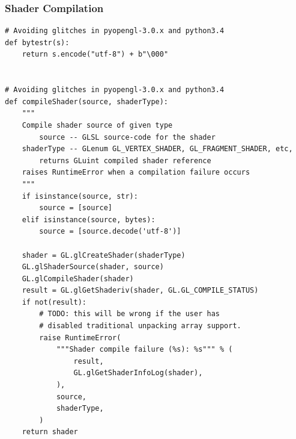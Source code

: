 \documentclass{beamer}
\begin{document}
\begin{frame}[fragile]
\frametitle{Shader Compilation}
\begin{verbatim}
# Avoiding glitches in pyopengl-3.0.x and python3.4
def bytestr(s):
    return s.encode("utf-8") + b"\000"


# Avoiding glitches in pyopengl-3.0.x and python3.4
def compileShader(source, shaderType):
    """
    Compile shader source of given type
        source -- GLSL source-code for the shader
    shaderType -- GLenum GL_VERTEX_SHADER, GL_FRAGMENT_SHADER, etc,
        returns GLuint compiled shader reference
    raises RuntimeError when a compilation failure occurs
    """
    if isinstance(source, str):
        source = [source]
    elif isinstance(source, bytes):
        source = [source.decode('utf-8')]

    shader = GL.glCreateShader(shaderType)
    GL.glShaderSource(shader, source)
    GL.glCompileShader(shader)
    result = GL.glGetShaderiv(shader, GL.GL_COMPILE_STATUS)
    if not(result):
        # TODO: this will be wrong if the user has
        # disabled traditional unpacking array support.
        raise RuntimeError(
            """Shader compile failure (%s): %s""" % (
                result,
                GL.glGetShaderInfoLog(shader),
            ),
            source,
            shaderType,
        )
    return shader
\end{verbatim}
\end{frame}
\end{document}
